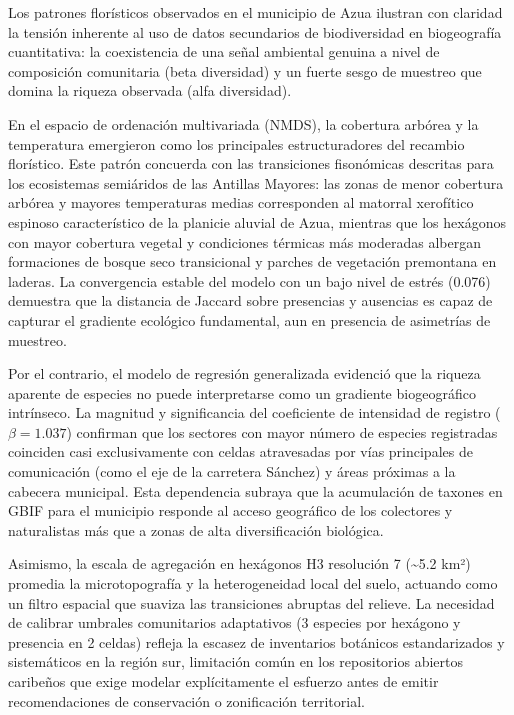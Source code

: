 \documentclass[
  12pt,
  man,
  floatsintext]{apa7}
\begin{document}
Los patrones florísticos observados en el municipio de Azua ilustran con claridad la tensión inherente al uso de datos secundarios de biodiversidad en biogeografía cuantitativa: la coexistencia de una señal ambiental genuina a nivel de composición comunitaria (beta diversidad) y un fuerte sesgo de muestreo que domina la riqueza observada (alfa diversidad).

En el espacio de ordenación multivariada (NMDS), la cobertura arbórea y la temperatura emergieron como los principales estructuradores del recambio florístico. Este patrón concuerda con las transiciones fisonómicas descritas para los ecosistemas semiáridos de las Antillas Mayores: las zonas de menor cobertura arbórea y mayores temperaturas medias corresponden al matorral xerofítico espinoso característico de la planicie aluvial de Azua, mientras que los hexágonos con mayor cobertura vegetal y condiciones térmicas más moderadas albergan formaciones de bosque seco transicional y parches de vegetación premontana en laderas. La convergencia estable del modelo con un bajo nivel de estrés (0.076) demuestra que la distancia de Jaccard sobre presencias y ausencias es capaz de capturar el gradiente ecológico fundamental, aun en presencia de asimetrías de muestreo.

Por el contrario, el modelo de regresión generalizada evidenció que la riqueza aparente de especies no puede interpretarse como un gradiente biogeográfico intrínseco. La magnitud y significancia del coeficiente de intensidad de registro (\(\beta = 1.037\)) confirman que los sectores con mayor número de especies registradas coinciden casi exclusivamente con celdas atravesadas por vías principales de comunicación (como el eje de la carretera Sánchez) y áreas próximas a la cabecera municipal. Esta dependencia subraya que la acumulación de taxones en GBIF para el municipio responde al acceso geográfico de los colectores y naturalistas más que a zonas de alta diversificación biológica.

Asimismo, la escala de agregación en hexágonos H3 resolución 7 (\textasciitilde5.2 km²) promedia la microtopografía y la heterogeneidad local del suelo, actuando como un filtro espacial que suaviza las transiciones abruptas del relieve. La necesidad de calibrar umbrales comunitarios adaptativos (3 especies por hexágono y presencia en 2 celdas) refleja la escasez de inventarios botánicos estandarizados y sistemáticos en la región sur, limitación común en los repositorios abiertos caribeños que exige modelar explícitamente el esfuerzo antes de emitir recomendaciones de conservación o zonificación territorial.
\end{document}
